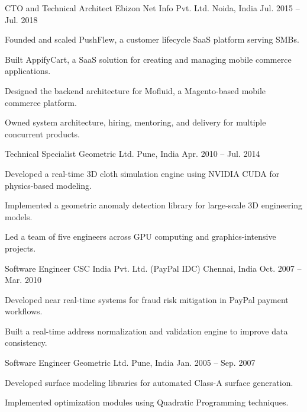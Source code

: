 \begin{cventries}
\cventry
  {CTO and Technical Architect}
  {Ebizon Net Info Pvt. Ltd.}
  {Noida, India}
  {Jul. 2015 – Jul. 2018}
  {
    \begin{cvitems}
      \item {Founded and scaled PushFlew, a customer lifecycle SaaS platform serving SMBs.}
      \item {Built AppifyCart, a SaaS solution for creating and managing mobile commerce applications.}
      \item {Designed the backend architecture for Mofluid, a Magento-based mobile commerce platform.}
      \item {Owned system architecture, hiring, mentoring, and delivery for multiple concurrent products.}
    \end{cvitems}
  }

\cventry
  {Technical Specialist}
  {Geometric Ltd.}
  {Pune, India}
  {Apr. 2010 – Jul. 2014}
  {
    \begin{cvitems}
      \item {Developed a real-time 3D cloth simulation engine using NVIDIA CUDA for physics-based modeling.}
      \item {Implemented a geometric anomaly detection library for large-scale 3D engineering models.}
      \item {Led a team of five engineers across GPU computing and graphics-intensive projects.}
    \end{cvitems}
  }

\cventry
  {Software Engineer}
  {CSC India Pvt. Ltd. (PayPal IDC)}
  {Chennai, India}
  {Oct. 2007 – Mar. 2010}
  {
    \begin{cvitems}
      \item {Developed near real-time systems for fraud risk mitigation in PayPal payment workflows.}
      \item {Built a real-time address normalization and validation engine to improve data consistency.}
    \end{cvitems}
  }

\cventry
  {Software Engineer}
  {Geometric Ltd.}
  {Pune, India}
  {Jan. 2005 – Sep. 2007}
  {
    \begin{cvitems}
      \item {Developed surface modeling libraries for automated Class-A surface generation.}
      \item {Implemented optimization modules using Quadratic Programming techniques.}
    \end{cvitems}
  }


\end{cventries}
